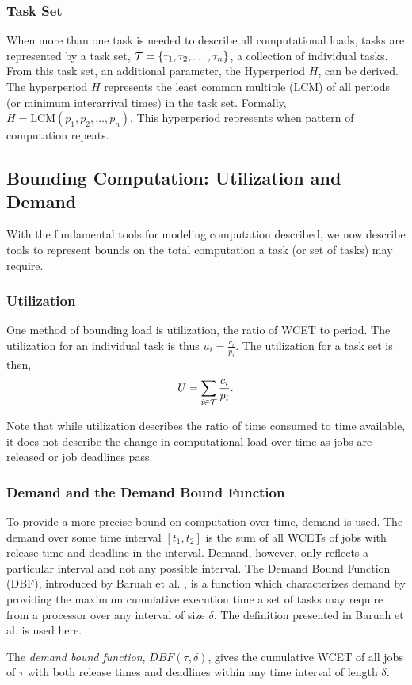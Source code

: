 \subsubsection{Task Set}

When more than one task is needed to describe all computational loads, tasks are represented by a task set, $\mathcal{T} = \{\tau_1, \tau_2, \dots, \tau_n\}$, a collection of individual tasks.
From this task set, an additional parameter, the Hyperperiod $H$, can be derived.
The hyperperiod $H$ represents the least common multiple (LCM) of all periods (or minimum interarrival times) in  the task set.
Formally, $H = \text{LCM}(p_1, p_2, \dots, p_n)$.
This hyperperiod represents when pattern of computation repeats.

\subsection{Bounding Computation: Utilization and Demand}

With the fundamental tools for modeling computation described, we now describe tools to represent bounds on the total computation a task (or set of tasks) may require. 

\subsubsection{Utilization}

One method of bounding load is utilization, the ratio of WCET to period.
The utilization for an individual task is thus $u_i = \frac{c_i}{p_i}$.
The utilization for a task set is then,
\begin{equation}
    U = \sum_{i \in \mathcal{T}} \frac{c_i}{p_i}.
\end{equation}

Note that while utilization describes the ratio of time consumed to time available, it does not describe the change in computational load over time as jobs are released or job deadlines pass.

\subsubsection{Demand and the Demand Bound Function}

To provide a more precise bound on computation over time, demand is used.
The demand over some time interval $[t_1,t_2]$ is the sum of all WCETs of jobs with release time and deadline in the interval.
Demand, however, only reflects a particular interval and not any possible interval.
The Demand Bound Function (DBF), introduced by Baruah et al. \cite{baruah_preemptively_1990}, is a function which characterizes demand by providing the maximum cumulative execution time a set of tasks may require from a processor over any interval of size $\delta$. 
The definition presented in Baruah et al. \cite{baruah_preemptively_1990} is used here.
\begin{definition}\label{def:dbf}
    The \textit{demand bound function}, $DBF(\tau,\delta)$, gives the cumulative WCET of all jobs of $\tau$ with both release times and deadlines within any time interval of length $\delta$.
\end{definition}

